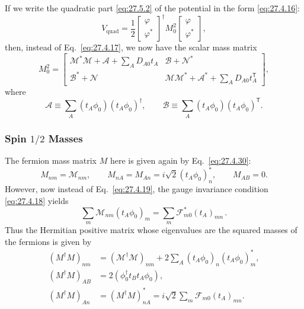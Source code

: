 If we write the quadratic part \eqref{eq:27.5.2} of the potential in the
form \eqref{eq:27.4.16}:
\[
  V_{\mathrm{quad}}
  =\frac12
  \begin{bmatrix}\varphi\\ \varphi^*\end{bmatrix}^{\!\dagger}
  M_0^2
  \begin{bmatrix}\varphi\\ \varphi^*\end{bmatrix},
\]
then, instead of Eq.~\eqref{eq:27.4.17}, we now have the scalar mass matrix
\begin{equation}
  M_0^2=
  \begin{bmatrix}
    \mathcal{M}^*\mathcal{M}+\mathcal{A}
      +\sum_A D_{A0}t_A
    &
    \mathcal{B}+\mathcal{N}^*
    \\
    \mathcal{B}^*+\mathcal{N}
    &
    \mathcal{M}\mathcal{M}^*+\mathcal{A}^*
      +\sum_A D_{A0}t_A^{\mathsf T}
  \end{bmatrix},
  \tag{27.5.4}\label{eq:27.5.4}
\end{equation}
where
\[
  \mathcal{A}\equiv
  \sum_A(t_A\phi_0)(t_A\phi_0)^\dagger,
  \qquad
  \mathcal{B}\equiv
  \sum_A(t_A\phi_0)(t_A\phi_0)^{\mathsf T}.
\]

\subsubsection*{Spin \(1/2\) Masses}

The fermion mass matrix \(M\) here is given again by
Eq.~\eqref{eq:27.4.30}:
\[
  M_{nm}=\mathcal{M}_{nm},
  \qquad
  M_{nA}=M_{An}=i\sqrt{2}(t_A\phi_0)_n^*,
  \qquad
  M_{AB}=0.
\]
However, now instead of Eq.~\eqref{eq:27.4.19}, the gauge invariance
condition \eqref{eq:27.4.18} yields
\begin{equation}
  \sum_m\mathcal{M}_{nm}(t_A\phi_0)_m
  =\sum_m\mathcal{F}_{m0}^*(t_A)_{mn}\,.
  \tag{27.5.5}\label{eq:27.5.5}
\end{equation}
Thus the Hermitian positive matrix whose eigenvalues are the squared masses
of the fermions is given by
\begin{equation}
  \begin{aligned}
  (M^\dagger M)_{nm}
  &=(\mathcal{M}^\dagger\mathcal{M})_{nm}
    +2\sum_A(t_A\phi_0)_n(t_A\phi_0)_m^*,
  \\
  (M^\dagger M)_{AB}
  &=2(\phi_0^\dagger t_Bt_A\phi_0),
  \\
  (M^\dagger M)_{An}
  &=(M^\dagger M)_{nA}^*
    =i\sqrt{2}\sum_m\mathcal{F}_{m0}(t_A)_{mn}.
  \end{aligned}
  \tag{27.5.6}\label{eq:27.5.6}
\end{equation}

